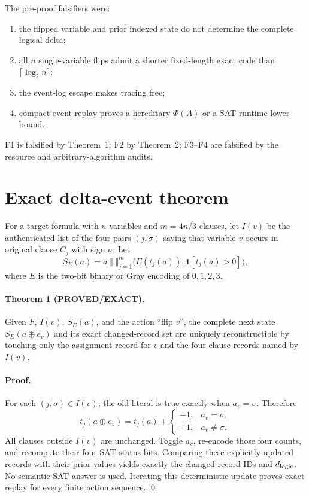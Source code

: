 \documentclass[11pt]{article}
\newcommand{\status}[1]{\textsf{#1}}
\begin{document}
The pre-proof falsifiers were:
\begin{enumerate}[label=F\arabic*.]
\item the flipped variable and prior indexed state do not determine the complete logical delta;
\item all $n$ single-variable flips admit a shorter fixed-length exact code than $\lceil\log_2n\rceil$;
\item the event-log escape makes tracing free;
\item compact event replay proves a hereditary $\Phi(A)$ or a SAT runtime lower bound.
\end{enumerate}
F1 is falsified by Theorem~1; F2 by Theorem~2; F3--F4 are falsified by the resource and arbitrary-algorithm audits.

\section{Exact delta-event theorem}
For a target formula with $n$ variables and $m=4n/3$ clauses, let $I(v)$ be the authenticated list of the four pairs $(j,\sigma)$ saying that variable $v$ occurs in original clause $C_j$ with sign $\sigma$.  Let
\[
 S_E(a)=a\;\Vert\;\big\Vert_{j=1}^{m}
   \bigl(E(t_j(a)),\mathbf 1[t_j(a)>0]\bigr),
\]
where $E$ is the two-bit binary or Gray encoding of $0,1,2,3$.

\paragraph{Theorem 1 (\status{PROVED/EXACT}).}
Given $F$, $I(v)$, $S_E(a)$, and the action ``flip $v$'', the complete next state $S_E(a\oplus e_v)$ and its exact changed-record set are uniquely reconstructible by touching only the assignment record for $v$ and the four clause records named by $I(v)$.

\paragraph{Proof.}
For each $(j,\sigma)\in I(v)$, the old literal is true exactly when $a_v=\sigma$.  Therefore
\[
 t_j(a\oplus e_v)=t_j(a)+
 \begin{cases}-1,&a_v=\sigma,\\+1,&a_v\ne\sigma.
 \end{cases}
\]
All clauses outside $I(v)$ are unchanged.  Toggle $a_v$, re-encode those four counts, and recompute their four SAT-status bits.  Comparing these explicitly updated records with their prior values yields exactly the changed-record IDs and $d_{\rm logic}$.  No semantic SAT answer is used.  Iterating this deterministic update proves exact replay for every finite action sequence. \qed
\end{document}
